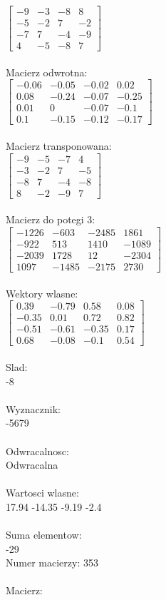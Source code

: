 \documentclass[a4paper,12pt]{article}
\begin{document}
$\begin{bmatrix} -9&-3&-8&8\\-5&-2&7&-2\\-7&7&-4&-9\\4&-5&-8&7 \end{bmatrix}$
\\
\\
Macierz odwrotna:\\

$\begin{bmatrix} -0.06&-0.05&-0.02&0.02\\0.08&-0.24&-0.07&-0.25\\0.01&0&-0.07&-0.1\\0.1&-0.15&-0.12&-0.17 \end{bmatrix}$
\\
\\
Macierz transponowana:\\

$\begin{bmatrix} -9&-5&-7&4\\-3&-2&7&-5\\-8&7&-4&-8\\8&-2&-9&7 \end{bmatrix}$
\\
\\
Macierz do potegi 3:\\

$\begin{bmatrix} -1226&-603&-2485&1861\\-922&513&1410&-1089\\-2039&1728&12&-2304\\1097&-1485&-2175&2730 \end{bmatrix}$
\\
\\
Wektory wlasne:\\

$\begin{bmatrix} 0.39&-0.79&0.58&0.08\\-0.35&0.01&0.72&0.82\\-0.51&-0.61&-0.35&0.17\\0.68&-0.08&-0.1&0.54 \end{bmatrix}$
\\
\\
Slad:\\
-8
\\
\\
Wyznacznik:\\
-5679
\\
\\
Odwracalnosc:\\
Odwracalna
\\
\\
Wartosci wlasne:\\
17.94 -14.35 -9.19 -2.4
\\
\\
Suma elementow:\\
-29
\\
\newpage
Numer macierzy:
353
\\
\\
Macierz:\\
\end{document}

